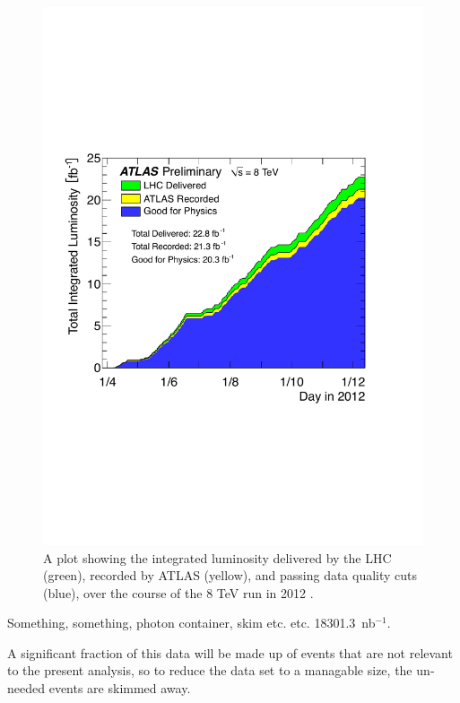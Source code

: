 \begin{english}
\begin{figure}[htp]
\begin{minipage}[b]{.69\textwidth}
\hspace{-1em}\includegraphics[width=\textwidth]{figures/intlumi}
\end{minipage}\hfill\begin{minipage}[b]{.3\textwidth}
\caption{A plot showing the integrated luminosity delivered by the LHC (green), recorded by ATLAS (yellow), and passing data quality cuts (blue), over the course of the 8 TeV run in 2012 \cite{publiclumi}.
\label{intlumi}}
\end{minipage}
\end{figure}

Something, something, photon container, skim etc. etc. 18301.3~nb$^{-1}$.

A significant fraction of this data will be made up of events that are not relevant to the present analysis, so to reduce the data set to a managable size, the unneeded events are skimmed away.


\end{english}
